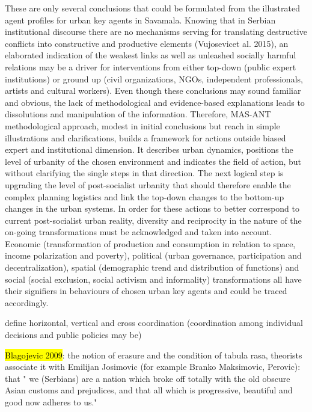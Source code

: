 \documentclass[11pt]{report}
\begin{document}
These are only several conclusions that could be formulated from the illustrated agent profiles for urban key agents in Savamala. Knowing that in Serbian institutional discourse there are no mechanisms serving for translating destructive conflicts into constructive and productive elements (Vujosevicet al. 2015), an elaborated indication of the weakest links as well as unleashed socially harmful relations may be a driver for interventions from either top-down (public expert institutions) or ground up (civil organizations, NGOs, independent professionals, artists and cultural workers). Even though these conclusions may sound familiar and obvious, the lack of methodological and evidence-based explanations leads to dissolutions and manipulation of the information. Therefore, MAS-ANT methodological approach, modest in initial conclusions but reach in simple illustrations and clarifications, builds a framework for actions outside biased expert and institutional dimension. It describes urban dynamics, positions the level of urbanity of the chosen environment and indicates the field of action, but without clarifying the single steps in that direction. The next logical step is upgrading the level of post-socialist urbanity that should therefore enable the complex planning logistics and link the top-down changes to the bottom-up changes in the urban systems. In order for these actions to better correspond to current post-socialist urban reality, diversity and reciprocity in the nature of the on-going transformations must be acknowledged and taken into account. Economic (transformation of production and consumption in relation to space, income polarization and poverty), political (urban governance, participation and decentralization), spatial (demographic trend and distribution of functions) and social (social exclusion, social activism and informality) transformations all have their signifiers in behaviours of chosen urban key agents and could be traced accordingly.

define horizontal, vertical and cross coordination (coordination among individual decisions and public policies may be)

\hl{Blagojevic 2009}: 
the notion of erasure and the condition of  tabula rasa, theorists associate it with Emilijan Josimovic (for example Branko Maksimovic, Perovic): that " we (Serbians) are a nation which broke off totally with the old obscure Asian customs and prejudices, and that all which is progressive, beautiful and good now adheres to us."
\end{document}
